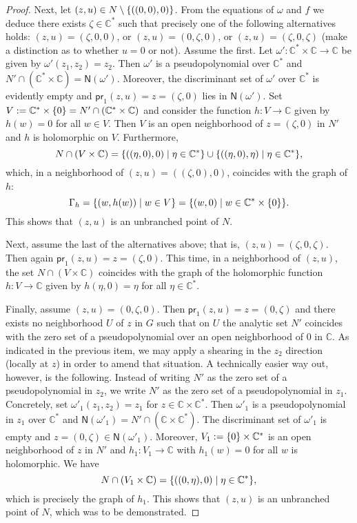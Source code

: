 \documentclass[a4paper]{amsart}
\newcommand{\C}{\mathbb{C}}
\newcommand{\Zero}[1]{\mathsf{N}(#1)}
\newcommand{\pr}[1]{\mathsf{pr}_{#1}}
\theoremstyle{remark}
\numberwithin{equation}{question}
\DeclarePairedDelimiter\set{\{}{\}}
\begin{document}
\begin{solution}
\begin{solenum}
\begin{proof}
Next, let $(z,u) \in N \setminus \set{((0,0),0)}$. From the equations of $\omega$ and $f$ we deduce there exists $\zeta \in \C^*$ such that precisely one of the following alternatives holds: $(z,u) = (\zeta,0,0)$, or $(z,u) = (0,\zeta,0)$, or $(z,u) = (\zeta,0,\zeta)$ (make a distinction as to whether $u = 0$ or not). Assume the first. Let $\omega' \colon \C^* \times \C \to \C$ be given by $\omega'(z_1,z_2) = z_2$. Then $\omega'$ is a pseudopolynomial over $\C^*$ and $N' \cap (\C^* \times \C) = \Zero{\omega'}$. Moreover, the discriminant set of $\omega'$ over $\C^*$ is evidently empty and $\pr1(z,u) = z = (\zeta,0)$ lies in $\Zero{\omega'}$. Set $V := \C^* \times \set0 = N' \cap (\C^* \times \C)$ and consider the function $h \colon V \to \C$ given by $h(w) = 0$ for all $w \in V$. Then $V$ is an open neighborhood of $z = (\zeta,0)$ in $N'$ and $h$ is holomorphic on $V$. Furthermore,
\[
N \cap (V \times \C) = \set{((\eta,0),0) \mid \eta \in \C^*} \cup \set{((\eta,0),\eta) \mid \eta \in \C^*},
\]
which, in a neighborhood of $(z,u) = ((\zeta,0),0)$, coincides with the graph of $h$:
\[
\Gamma_h = \set{(w,h(w)) \mid w \in V} = \set{(w,0) \mid w \in \C^* \times \set0}.
\]
This shows that $(z,u)$ is an unbranched point of $N$.

Next, assume the last of the alternatives above; that is, $(z,u) = (\zeta,0,\zeta)$. Then again $\pr1(z,u) = z = (\zeta,0)$. This time, in a neighborhood of $(z,u)$, the set $N \cap (V \times \C)$ coincides with the graph of the holomorphic function $h \colon V \to \C$ given by $h(\eta,0) = \eta$ for all $\eta \in \C^*$.

Finally, assume $(z,u) = (0,\zeta,0)$. Then $\pr1(z,u) = z = (0,\zeta)$ and there exists no neighborhood $U$ of $z$ in $G$ such that on $U$ the analytic set $N'$ coincides with the zero set of a pseudopolynomial over an open neighborhood of $0$ in $\C$. As indicated in the previous item, we may apply a shearing in the $z_2$ direction (locally at $z$) in order to amend that situation. A technically easier way out, however, is the following. Instead of writing $N'$ as the zero set of a pseudopolynomial in $z_2$, we write $N'$ as the zero set of a pseudopolynomial in $z_1$. Concretely, set $\omega'_1(z_1,z_2) = z_1$ for $z \in \C \times \C^*$. Then $\omega'_1$ is a pseudopolynomial in $z_1$ over $\C^*$ and $\Zero{\omega'_1} = N' \cap (\C \times \C^*)$. The discriminant set of $\omega'_1$ is empty and $z = (0,\zeta) \in \Zero{\omega'_1}$. Moreover, $V_1 := \set0 \times \C^*$ is an open neighborhood of $z$ in $N'$ and $h_1 \colon V_1 \to \C$ with $h_1(w) = 0$ for all $w$ is holomorphic. We have
\[
N \cap (V_1 \times \C) = \set{((0,\eta),0) \mid \eta \in \C^*},
\]
which is precisely the graph of $h_1$. This shows that $(z,u)$ is an unbranched point of $N$, which was to be demonstrated.
\end{proof}
\end{solenum}
\end{solution}
\end{document}
